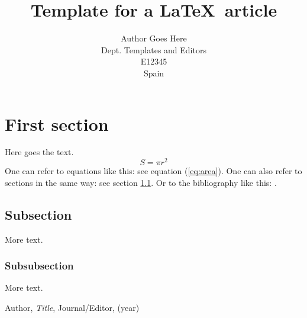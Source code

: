 \documentclass{article}
\title{Template for a \LaTeX\ article}
\author{Author Goes Here\\
  \small Dept. Templates and Editors\\
  \small E12345\\
  \small Spain
}
\theoremstyle{definition}
\theoremstyle{remark}
\begin{document}
\maketitle


\section{First section}

Here goes the text.
\begin{equation}\label{eq:area}
  S = \pi r^2
\end{equation}
One can refer to equations like this: see equation (\ref{eq:area}). One can also
refer to sections in the same way: see section \ref{sec:nothing}. Or
to the bibliography like this: \cite{Cd94}.

\subsection{Subsection}\label{sec:nothing}

More text.

\subsubsection{Subsubsection}\label{sec:nothing2}

More text.

\begin{thebibliography}{99}

 Author, \emph{Title}, Journal/Editor, (year)

\end{thebibliography}
\end{document}
